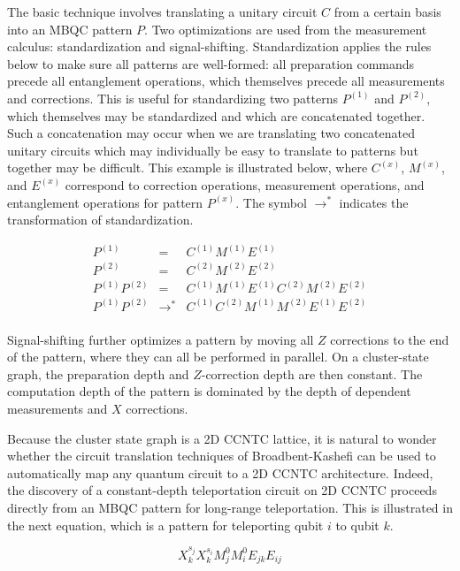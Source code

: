 The basic
technique involves translating a unitary circuit $C$ from a certain basis
into an MBQC pattern $P$. Two optimizations are used from the measurement
calculus: standardization and signal-shifting. Standardization applies
the rules below to make sure all patterns are well-formed: all
preparation commands precede all entanglement operations, which themselves
precede all measurements and corrections. This is useful for
standardizing two patterns $P^(1)$ and $P^(2)$, which themselves may be
standardized and which are concatenated together. Such a concatenation
may occur when we are translating two concatenated unitary circuits
which may individually be easy to translate to patterns but together may
be difficult. This example is illustrated below, where $C^{(x)}$,
$M^{(x)}$, and $E^{(x)}$ correspond to correction operations, measurement
operations, and entanglement operations for pattern $P^{(x)}$.
The symbol $\rightarrow^{*}$ indicates the transformation of standardization.

\begin{eqnarray}
P^{(1)} & = & C^{(1)}M^{(1)}E^{(1)} \\
P^{(2)} & = & C^{(2)}M^{(2)}E^{(2)} \\
P^{(1)}P^{(2)} & = & C^{(1)}M^{(1)}E^{(1)}C^{(2)}M^{(2)}E^{(2)} \\
P^{(1)}P^{(2)} & \rightarrow^{*} & C^{(1)}C^{(2)}M^{(1)}M^{(2)}E^{(1)}E^{(2)} \\
\end{eqnarray}

Signal-shifting further optimizes a pattern by moving all $Z$ corrections to
the end of the pattern, where they can all be performed in parallel. On a
cluster-state graph, the preparation depth and $Z$-correction depth are then
constant. The computation depth of the pattern is dominated by the
depth of dependent measurements and $X$ corrections.

Because the cluster state graph is a 2D CCNTC lattice, it is natural to
wonder whether the circuit translation techniques of Broadbent-Kashefi
can be used to automatically map any quantum circuit to a 2D CCNTC
architecture. Indeed, the discovery of a constant-depth teleportation
circuit on \textsf{2D CCNTC} proceeds directly from an MBQC pattern
for long-range teleportation. This is illustrated in the next equation,
which is a pattern for teleporting qubit $i$ to qubit $k$.

\begin{equation}
X^{s_j}_k X^{s_i}_k M^0_j M^0_i E_{jk} E_{ij}
\end{equation}


